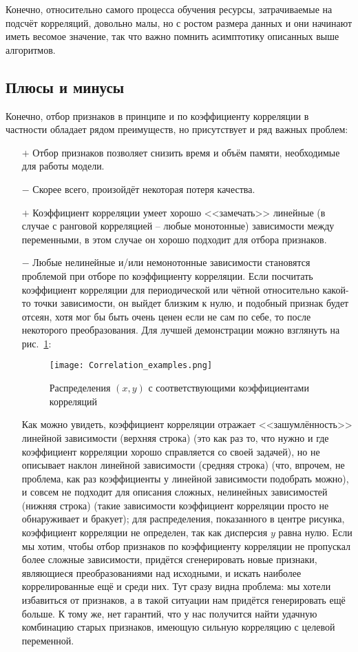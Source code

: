 \documentclass[12pt,fleqn]{article}
\begin{document}
	Конечно, относительно самого процесса обучения ресурсы, затрачиваемые на подсчёт корреляций, довольно малы, но с ростом размера данных и они начинают иметь весомое значение, так что важно помнить асимптотику описанных выше алгоритмов.



	\subsection{Плюсы и минусы}

	Конечно, отбор признаков в принципе и по коэффициенту корреляции в частности обладает рядом преимуществ, но присутствует и ряд важных проблем:
	\begin{itemize}
		\item[$ + $] Отбор признаков позволяет снизить время и объём памяти, необходимые для работы модели.
		\item[$ - $] Скорее всего, произойдёт некоторая потеря качества.
		\item[$ + $] Коэффициент корреляции умеет хорошо <<замечать>> линейные (в случае с ранговой корреляцией – любые монотонные) зависимости между переменными, в этом случае он хорошо подходит для отбора признаков.
		\item[$ - $] Любые нелинейные и/или немонотонные зависимости становятся проблемой при отборе по коэффициенту корреляции. Если посчитать коэффициент корреляции для периодической или чётной относительно какой-то точки зависимости, он выйдет близким к нулю, и подобный признак будет отсеян, хотя мог бы быть очень ценен если не сам по себе, то после некоторого преобразования. Для лучшей демонстрации можно взглянуть на рис.~\ref{fig:corr}:
		\begin{center}
			\begin{figure}[!htb]
				\centering
				\texttt{[image: Correlation\_examples.png]}
				\caption{Распределения $ (x, y) $ с соответствующими коэффициентами корреляций}\label{fig:corr}
			\end{figure}
		\end{center}
		Как можно увидеть, коэффициент корреляции отражает <<зашумлённость>> линейной зависимости (верхняя строка) (это как раз то, что нужно и где коэффициент корреляции хорошо справляется со своей задачей), но не описывает наклон линейной зависимости (средняя строка) (что, впрочем, не проблема, как раз коэффициенты у линейной зависимости подобрать можно), и совсем не подходит для описания сложных, нелинейных зависимостей (нижняя строка) (такие зависимости коэффициент корреляции просто не обнаруживает и бракует); для распределения, показанного в центре рисунка, коэффициент корреляции не определен, так как дисперсия $ y $ равна нулю. Если мы хотим, чтобы отбор признаков по коэффициенту корреляции не пропускал более сложные зависимости, придётся сгенерировать новые признаки, являющиеся преобразованиями над исходными, и искать наиболее коррелированные ещё и среди них. Тут сразу видна проблема: мы хотели избавиться от признаков, а в такой ситуации нам придётся генерировать ещё больше. К тому же, нет гарантий, что у нас получится найти удачную комбинацию старых признаков, имеющую сильную корреляцию с целевой переменной.
		

\end{itemize}
\end{document}
